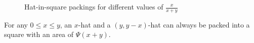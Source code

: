 \documentclass[%
    a4paper,              %
    style=print,          %
    bibliography=totoc,   %
    nexus,                %
    lnum,                 %
    extramargin,          %
]{tubsbook}
\begin{document}
\newpage

\begin{figure}[htb]
    \centering


    \caption{Hat-in-square packings for different values of $\frac{x}{x+y}$}
    \label{fig:hatsinsquare}
\end{figure}

\begin{theorem}\label{th:hatsinsquare}
    For any $0 \le x \le y$, an $x$-hat and a $(y,y-x)$-hat can always be packed into a square with an area of $\Psi(x+y)$.
\end{theorem}
\end{document}
